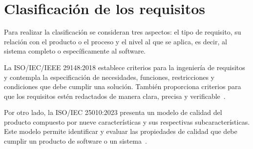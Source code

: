 \section{Clasificación de los requisitos}

Para realizar la clasificación se consideran tres aspectos: el tipo de requisito, su relación con el producto o el proceso y el nivel al que se aplica, es decir, al sistema completo o específicamente al software.

La ISO/IEC/IEEE 29148:2018 establece criterios para la ingeniería de requisitos y contempla la especificación de necesidades, funciones, restricciones y condiciones que debe cumplir una solución. También proporciona criterios para que los requisitos estén redactados de manera clara, precisa y verificable~\cite{iso29148}.

Por otro lado, la ISO/IEC 25010:2023 presenta un modelo de calidad del producto compuesto por nueve características y sus respectivas subcaracterísticas. Este modelo permite identificar y evaluar las propiedades de calidad que debe cumplir un producto de software o un sistema~\cite{iso25010}.

